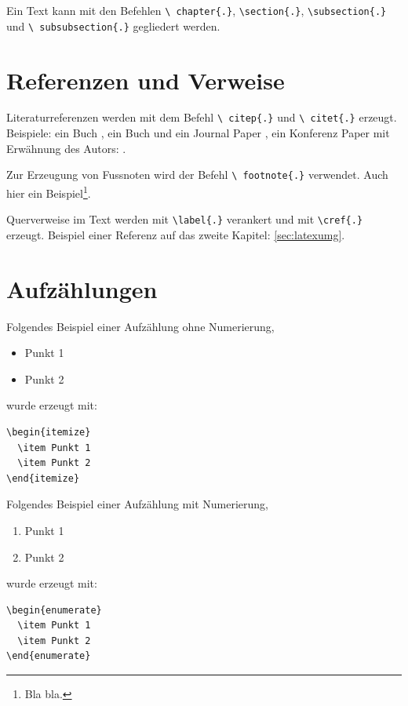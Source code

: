Ein Text kann mit den Befehlen \texttt{\textbackslash
chapter\{.\}}, \texttt{\textbackslash section\{.\}},
\texttt{\textbackslash subsection\{.\}} und \texttt{\textbackslash
subsubsection\{.\}} gegliedert werden.


\section{Referenzen und Verweise}
\label{sec:refverw}

Literaturreferenzen werden mit dem Befehl \texttt{\textbackslash
citep\{.\}} und \texttt{\textbackslash
citet\{.\}} erzeugt. Beispiele: ein Buch \citep{Raibert1986LeggedRobotsThatBalance}, ein Buch und ein Journal Paper \citep{Raibert1986LeggedRobotsThatBalance,Vukobratovic2004ZeroMomentPoint}, ein Konferenz Paper mit Erwähnung des Autors: \citet{Pratt1995SEA}.

Zur Erzeugung von Fussnoten wird der Befehl \texttt{\textbackslash
footnote\{.\}} verwendet. Auch hier ein Beispiel\footnote{Bla
bla.}.

Querverweise im Text werden mit \texttt{\textbackslash label\{.\}}
verankert und mit \texttt{\textbackslash cref\{.\}} erzeugt.
Beispiel einer Referenz auf das zweite Kapitel:
\cref{sec:latexumg}.


\section{Aufzählungen}\label{sec:aufz}

Folgendes Beispiel einer Aufzählung ohne Numerierung,
\begin{itemize}
  \item Punkt 1
  \item Punkt 2
\end{itemize}
wurde erzeugt mit:
\begin{verbatim}
\begin{itemize}
  \item Punkt 1
  \item Punkt 2
\end{itemize}
\end{verbatim}

Folgendes Beispiel einer Aufzählung mit Numerierung,
\begin{enumerate}
  \item Punkt 1
  \item Punkt 2
\end{enumerate}
wurde erzeugt mit:
\begin{verbatim}
\begin{enumerate}
  \item Punkt 1
  \item Punkt 2
\end{enumerate}
\end{verbatim}

